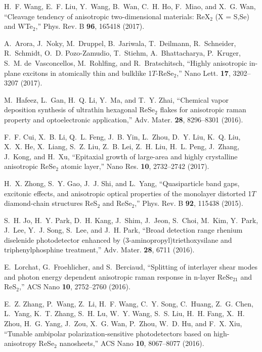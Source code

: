 \documentclass{osa-article}
\begin{document}
\begin{thebibliography}{1}
H.~F. Wang, E.~F. Liu, Y.~Wang, B.~Wan, C.~H. Ho, F.~Miao, and X.~G. Wan,
  \enquote{Cleavage tendency of anisotropic two-dimensional materials: {ReX$_2$
  (X = S,Se)} and {WTe$_2$},} Phys. Rev. B \textbf{96}, 165418 (2017).

A.~Arora, J.~Noky, M.~Druppel, B.~Jariwala, T.~Deilmann, R.~Schneider,
  R.~Schmidt, O.~D. Pozo-Zamudio, T.~Stiehm, A.~Bhattacharya, P.~Kruger, S.~M.
  de~Vasconcellos, M.~Rohlfing, and R.~Bratschitsch, \enquote{Highly
  anisotropic in-plane excitons in atomically thin and bulklike
  {1$T$-ReSe$_2$},} Nano Lett. \textbf{17}, 3202--3207 (2017).

M.~Hafeez, L.~Gan, H.~Q. Li, Y.~Ma, and T.~Y. Zhai, \enquote{Chemical vapor
  deposition synthesis of ultrathin hexagonal {ReSe$_2$} flakes for anisotropic
  raman property and optoelectronic application,} Adv. Mater. \textbf{28},
  8296--8301 (2016).

F.~F. Cui, X.~B. Li, Q.~L. Feng, J.~B. Yin, L.~Zhou, D.~Y. Liu, K.~Q. Liu,
  X.~X. He, X.~Liang, S.~Z. Liu, Z.~B. Lei, Z.~H. Liu, H.~L. Peng, J.~Zhang,
  J.~Kong, and H.~Xu, \enquote{Epitaxial growth of large-area and highly
  crystalline anisotropic {ReSe$_2$} atomic layer,} Nano Res. \textbf{10},
  2732--2742 (2017).

H.~X. Zhong, S.~Y. Gao, J.~J. Shi, and L.~Yang, \enquote{Quasiparticle band
  gaps, excitonic effects, and anisotropic optical properties of the monolayer
  distorted {1$T$} diamond-chain structures {ReS$_2$} and {ReSe$_2$},} Phys.
  Rev. B \textbf{92}, 115438 (2015).

S.~H. Jo, H.~Y. Park, D.~H. Kang, J.~Shim, J.~Jeon, S.~Choi, M.~Kim, Y.~Park,
  J.~Lee, Y.~J. Song, S.~Lee, and J.~H. Park, \enquote{Broad detection range
  rhenium diselenide photodetector enhanced by (3-aminopropyl)triethoxysilane
  and triphenylphosphine treatment,} Adv. Mater. \textbf{28}, 6711 (2016).

E.~Lorchat, G.~Froehlicher, and S.~Berciaud, \enquote{Splitting of interlayer
  shear modes and photon energy dependent anisotropic raman response in n-layer
  {ReSe$_21$} and {ReS$_2$},} ACS Nano \textbf{10}, 2752--2760 (2016).

E.~Z. Zhang, P.~Wang, Z.~Li, H.~F. Wang, C.~Y. Song, C.~Huang, Z.~G. Chen,
  L.~Yang, K.~T. Zhang, S.~H. Lu, W.~Y. Wang, S.~S. Liu, H.~H. Fang, X.~H.
  Zhou, H.~G. Yang, J.~Zou, X.~G. Wan, P.~Zhou, W.~D. Hu, and F.~X. Xiu,
  \enquote{Tunable ambipolar polarization-sensitive photodetectors based on
  high-anisotropy {ReSe$_2$} nanosheets,} ACS Nano \textbf{10}, 8067--8077
  (2016).


\end{thebibliography}
\end{document}
